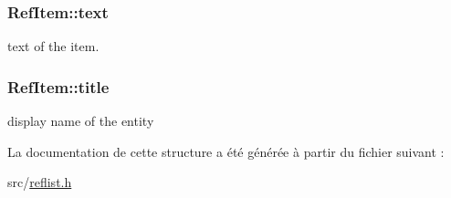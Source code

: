 \subsubsection[{text}]{ Ref\+Item\+::text}\label{struct_ref_item_a03313f190ccfba8be0bcfbb5dedf6c73}


text of the item. 

\hypertarget{struct_ref_item_a5160b8acde58f43ebfc2842281591acd}{}
\subsubsection[{title}]{ Ref\+Item\+::title}\label{struct_ref_item_a5160b8acde58f43ebfc2842281591acd}


display name of the entity 



La documentation de cette structure a été générée à partir du fichier suivant \+:\begin{DoxyCompactItemize}
\item 
src/\hyperlink{reflist_8h}{reflist.\+h}\end{DoxyCompactItemize}
